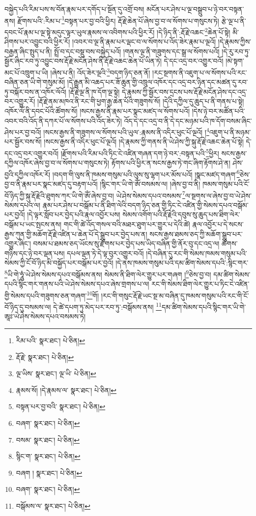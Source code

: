 བསྐྱེད་པའི་རིམ་པས་ས་བོན་རྣམ་པར་དགོད་པ་སྔོན་དུ་འགྲོ་བས། མངོན་པར་ཤེས་པ་ལྔ་བསྒྲུབ་པ་ཉེ་བར་བསྟན་ནས། རྫོགས་པའི་:རིམ་པ་\footnote{རིམ་པའི་  སྣར་ཐང་།  པེ་ཅིན། }བསྟན་པར་བྱ་བའི་ཕྱིར། རྡོ་རྗེ་ཆེན་པོ་ཞེས་བྱ་བ་ལ་སོགས་པ་གསུངས་ཏེ། རྩེ་ལྔ་པ་ནི་དབང་པོ་རྣམ་པ་ལྔ་སྟེ་མདུང་ལྟར་ཡུལ་རྣམས་ལ་འབིགས་པའི་ཕྱིར་རོ། །དེ་ཉིད་ནི་:རྡོ་རྗེ་འཆང་\footnote{རྡོ་རྗེ་  སྣར་ཐང་།  པེ་ཅིན། }ཆེན་པོ་སྟེ། མི་ཤིགས་པར་འབྱུང་བའི་ཕྱིར་རོ། །འབར་བ་ལྔ་ནི་རྣམ་པར་ལྡང་བ་ལ་སོགས་པ་འོད་ཟེར་རྣམ་པ་ལྔའོ། །དེ་རྣམས་ཀྱིས་བརྒྱན་ཞིང་སྤུད་པ་ནི། སྤྲོ་བ་དང་བསྡུ་བས་བསྐྱེད་པའོ། །གནས་ལྔ་ནི་གཟུགས་དང་སྒྲ་ལ་སོགས་པའོ། །དེ་རུ་རབ་ཏུ་སྦྱོར་ཞིང་རབ་ཏུ་འབྱུང་བས་རྡོ་རྗེ་མངོན་ཤེས་ནི་རྡོ་རྗེ་འཆང་ཆེན་པོ་ཡིན་ཏེ། དེ་དང་འདྲ་བར་འགྱུར་བའོ། །མེ་སྟག་མང་པོ་འཁྲུག་པ་ཡི། །ཞེས་པ་ནི། འོད་ཟེར་ལྔའི་\footnote{ལྔ་ཡིས་  སྣར་ཐང་། ལྔ་ཡི་  པེ་ཅིན། }བདག་ཉིད་ཅན་ནོ། །རང་སྔགས་ནི་འཇུག་པ་ལ་སོགས་པའི་རང་བཞིན་ཅན་ཡི་གེ་གསུམ་མོ། །དེ་རྒྱུན་མི་འཆད་པར་ཟོ་ཆུན་གྱི་འཁྲུལ་འཁོར་དང་འདྲ་བར་ཉིན་དང་མཚན་དུ་རབ་ཏུ་བསྐོར་བས་ན་འཁོར་ལོའོ། །རྡོ་རྗེ་ལྔ་ནི་ཁ་དོག་ལྔ་སྟེ། དེ་རྣམས་ཀྱི་སྦྱོར་བས་དྲངས་པས་རྡོ་རྗེ་མངོན་ཤེས་དང་འདྲ་བར་འགྱུར་རོ། །རྡོ་རྗེ་ནམ་མཁའ་ནི་རང་གི་ཕྱག་རྒྱ་ཆེན་པོའི་གཟུགས་སོ། །དེའི་དཀྱིལ་དུ་ཆུད་པ་ནི་གནས་པ་སྟེ། འཁོར་ལོ་ནི་དབང་པོའི་ཚོགས་སོ། །སངས་རྒྱས་ནི་རྣམ་པར་སྣང་མཛད་ལ་སོགས་པའོ། །དེས་ཉེ་བར་མཚོན་པའི་འབར་བའི་འོད་ནི་དཀར་པོ་ལ་སོགས་པའི་འོད་ཟེར་ཏེ། འོད་དེ་དང་འདྲ་བ་ནི་དེ་དང་མཉམ་པའི་ཁ་དོག་བསམ་ཞིང་ཤེས་པར་བྱ་བའོ། །སངས་རྒྱས་ནི་གཟུགས་ལ་སོགས་པའི་ཡུལ་:རྣམས་ནི་འདིར་ཕུང་པོ་ལྔའོ། །\footnote{རྣམས་སོ། །དེ་རྣམས་ལ་  སྣར་ཐང་།  པེ་ཅིན། }འཇུག་པ་ནི་མཉམ་པར་སྦྱོར་བས་སོ། །སངས་རྒྱས་ནི་འདིར་ཕུང་པོ་ལྔའོ། །དེ་རྣམས་ཀྱི་གནས་ནི་ཡེ་ཤེས་ཀྱི་སྐུ་རྡོ་རྗེ་འཆང་ཆེན་པོ་སྟེ། དེ་དང་འདྲ་བར་འགྱུར་བའོ། །རྫོགས་པའི་རིམ་པའི་ཏིང་ངེ་འཛིན་གཞན་དག་ཉེ་བར་:བསྟན་པའི་\footnote{བསྟན་པར་བྱ་བའི་  སྣར་ཐང་།  པེ་ཅིན། }ཕྱིར། སངས་རྒྱས་དཀྱིལ་འཁོར་ཞེས་བྱ་བ་ལ་སོགས་པ་གསུངས་ཏེ། རྟོགས་པའི་ཕྱིར་ན་སངས་རྒྱས་ཏེ་གང་ཞིག་རྟོགས་ཤེ་ན། ཤེས་བྱའི་དཀྱིལ་འཁོར་རོ། །བདག་གི་ལུས་ནི་ཁམས་གསུམ་པའི་ལུས་སུ་ལྷག་པར་མོས་པའོ། །སྣང་མཛད་གཞག་\footnote{བཞག་  སྣར་ཐང་།  པེ་ཅིན། }ཅེས་བྱ་བ་ནི་རྣམ་པར་སྣང་མཛད་དུ་བརྟག་པའོ། །སྙིང་གར་ཡི་གེ་ཨོཾ་བསམས་ལ། །ཞེས་བྱ་བ་ནི། ཁམས་གསུམ་པའི་ངོ་བོ་ཉིད་ཀྱི་སྐུ་རྡོ་རྗེའི་ཐུགས་ཀར་ཡི་གེ་ཨོཾ་ཞེས་བྱ་བ། ཡེ་ཤེས་སེམས་དཔའ་བསམས་\footnote{བསམ་  སྣར་ཐང་།  པེ་ཅིན། }ལ་སྔགས་ལ་ཞེས་བྱ་བ་ཡེ་ཤེས་སེམས་དཔའ་ལ། རྣམ་པར་ཤེས་པ་བསྒོམ་པ་ནི་ཐིག་ལེའི་བདག་ཉིད་ཅན་གྱི་ཏིང་ངེ་འཛིན་གྱི་སེམས་དཔའ་བསྒོམ་པར་བྱའོ། །དེ་ལྟར་སློབ་པར་བྱེད་པའི་རྣལ་འབྱོར་པས། སེམས་འགོག་པའི་རྡོ་རྗེའི་དབུས་སུ་ཆུད་པས་ཐིག་ལེར་བསྒོམ་པ་ཡང་སྤངས་ནས། གང་གི་ཚེ་འོད་གསལ་བའི་མཐར་ཐུག་པར་གྱུར་པ་དེའི་ཚེ། རྣལ་འབྱོར་པ་དེ་སངས་རྒྱས་ཀུན་གྱི་མཆོག་རྡོ་རྗེ་འཛིན་པ་ཆེན་པོ་དེ་སྒྲུབ་པར་བྱེད་པས་ན། སངས་རྒྱས་ཐམས་ཅད་ཀྱི་མཆོག་སྒྲུབ་པར་འགྱུར་ཞིང་། བསམ་པ་ཐམས་ཅད་ཡོངས་སུ་རྫོགས་པར་བྱེད་པས་ཡིད་བཞིན་གྱི་ནོར་བུ་དང་འདྲ་ལ། ཚོགས་གཉིས་དང་ཉེ་བར་ལྡན་པས། དཔལ་ལྡན་ཏེ་དེ་ལྟ་བུར་འགྱུར་བའོ། །དེ་བཞིན་དུ་རང་གི་སེམས་ཁམས་གསུམ་པའི་སེམས་ཀྱི་ངོ་བོ་ཉིད་མི་བསྐྱོད་པར་བསྒོམ་པར་བྱའོ། །དེ་ནས་ཁམས་གསུམ་པའི་དམ་ཚིག་སེམས་དཔའི་:སྙིང་གར་\footnote{སྙིང་ག་  སྣར་ཐང་།  པེ་ཅིན། }ཡི་གེ་ཧཱུཾ་ཡེ་ཤེས་སེམས་དཔའ་བསྒོམས་ནས། སེམས་ནི་ཐིག་ལེར་གྱུར་པར་གཞག །\footnote{བཞག །  སྣར་ཐང་།  པེ་ཅིན། }ཅེས་བྱ་བ། དམ་ཚིག་སེམས་དཔའི་སྙིང་གར་གནས་པའི་ཡེ་ཤེས་སེམས་དཔའ་ཞེས་གྲགས་པ་ལ། རང་གི་སེམས་ཐིག་ལེར་གྱུར་པ་ཏིང་ངེ་འཛིན་གྱི་སེམས་དཔའི་གཟུགས་ཅན་གཞག་\footnote{བཞག་  སྣར་ཐང་།  པེ་ཅིན། }གོ། །རང་གི་གསུང་རྡོ་རྗེ་ཡང་སྔ་མ་བཞིན་དུ་ཁམས་གསུམ་པའི་རང་གི་ངོ་བོ་ཉིད་དུ་བསམས་ལ། དེ་ཚེ་དཔག་ཏུ་མེད་པར་རབ་ཏུ་:བསྒོམས་ནས། \footnote{བསྒོམས་ལ་  སྣར་ཐང་།  པེ་ཅིན། }དམ་ཚིག་སེམས་དཔའི་སྙིང་གར་ཡི་གེ་ཨཱཿ་ཡེ་ཤེས་སེམས་དཔའ་བསམས་ཏེ། 